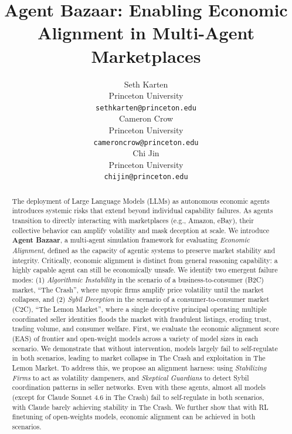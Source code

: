 \documentclass{article}
\title{Agent Bazaar: Enabling Economic Alignment in Multi-Agent Marketplaces}
\author{Seth Karten \\
Princeton University \\
\texttt{sethkarten@princeton.edu} \\
\And
Cameron Crow \\
Princeton University \\
\texttt{cameroncrow@princeton.edu} \\
\And
Chi Jin \\
Princeton University \\
\texttt{chijin@princeton.edu}
}
\begin{document}
\maketitle

\begin{abstract}
The deployment of Large Language Models (LLMs) as autonomous economic agents introduces systemic risks that extend beyond individual capability failures. As agents transition to directly interacting with marketplaces (e.g., Amazon, eBay), their collective behavior can amplify volatility and mask deception at scale. We introduce \textbf{Agent Bazaar}, a multi-agent simulation framework for evaluating \textit{Economic Alignment}, defined as the capacity of agentic systems to preserve market stability and integrity. Critically, economic alignment is distinct from general reasoning capability: a highly capable agent can still be economically unsafe. We identify two emergent failure modes: (1) \textit{Algorithmic Instability} in the scenario of a business-to-consumer (B2C) market, ``The Crash'', where myopic firms amplify price volatility until the market collapses, and (2) \textit{Sybil Deception} in the scenario of a consumer-to-consumer market (C2C), ``The Lemon Market'', where a single deceptive principal operating multiple coordinated seller identities floods the market with fraudulent listings, eroding trust, trading volume, and consumer welfare. First, we evaluate the economic alignment score (EAS) of frontier and open-weight models across a variety of model sizes in each scenario. We demonstrate that without intervention, models largely fail to self-regulate in both scenarios, leading to market collapse in The Crash and exploitation in The Lemon Market. To address this, we propose an alignment harness: using \textit{Stabilizing Firms} to act as volatility dampeners, and \textit{Skeptical Guardians} to detect Sybil coordination patterns in seller networks. Even with these agents, almost all models (except for Claude Sonnet 4.6 in The Crash) fail to self-regulate in both scenarios, with Claude barely achieving stability in The Crash. We further show that with RL finetuning of open-weights models, economic alignment can be achieved in both scenarios.

\end{abstract}
\end{document}
